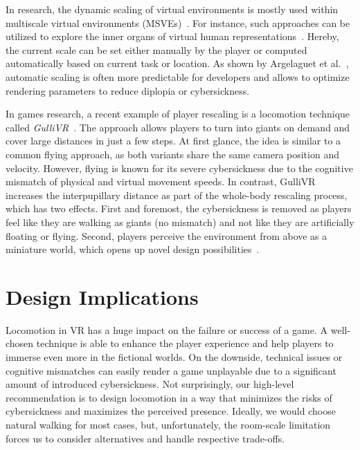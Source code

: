 In research, the dynamic scaling of virtual environments is mostly used within multiscale virtual environments (MSVEs)~\cite{Zhang:2002:SIM:571878.571884}. For instance, such approaches can be utilized to explore the inner organs of virtual human representations~\cite{kopper2006design}. Hereby, the current scale can be set either manually by the player or computed automatically based on current task or location. As shown by Argelaguet et al.~\cite{argelaguet2016giant}, automatic scaling is often more predictable for developers and allows to optimize rendering parameters to reduce diplopia or cybersickness.

In games research, a recent example of player rescaling is a locomotion technique called \textit{GulliVR}~\cite{Krekhov:2018:GVRA}. The approach allows players to turn into giants on demand and cover large distances in just a few steps. At first glance, the idea is similar to a common flying approach, as both variants share the same camera position and velocity. However, flying is known for its severe cybersickness due to the cognitive mismatch of physical and virtual movement speeds. In contrast, GulliVR increases the interpupillary distance as part of the whole-body rescaling process, which has two effects. First and foremost, the cybersickness is removed as players feel like they are walking as giants (no mismatch) and not like they are artificially floating or flying. Second, players perceive the environment from above as a miniature world, which opens up novel design possibilities~\cite{cmentowski2019outstanding}.


\section{Design Implications}




Locomotion in VR has a huge impact on the failure or success of a game. A well-chosen technique is able to enhance the player experience and help players to immerse even more in the fictional worlds. On the downside, technical issues or cognitive mismatches can easily render a game unplayable due to a significant amount of introduced cybersickness. Not surprisingly, our high-level recommendation is to design locomotion in a way that minimizes the risks of cybersickness and maximizes the perceived presence. Ideally, we would choose natural walking for most cases, but, unfortunately, the room-scale limitation forces us to consider alternatives and handle respective trade-offs.

